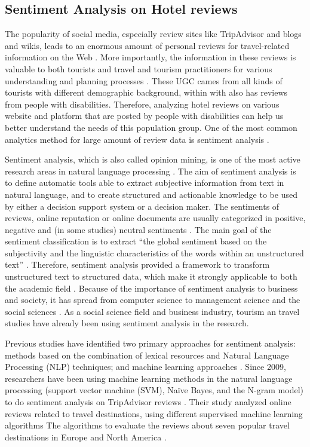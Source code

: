 \subsection{Sentiment Analysis on Hotel reviews}
The popularity of social media, especially review sites like 
TripAdvisor and blogs and wikis, leads to an enormous amount of personal 
reviews for travel-related information on the Web \cite{opinion2014}. 
More importantly, the information in these reviews is valuable to both 
tourists and travel and tourism practitioners for various understanding 
and planning processes \cite{YE20096527}. These UGC cames from all kinds of 
tourists with different demographic background, within with also has reviews 
from people with disabilities. Therefore, analyzing hotel reviews on various 
website and platform that are posted by people with disabilities can help 
us better understand the needs of this population group. One of the most 
common analytics method for large amount of review data is sentiment analysis \cite{opinion2014}.

Sentiment analysis, which is also called opinion mining, is one of the most active
research areas in natural language processing \cite{opinion2014}. The aim of 
sentiment analysis is to define automatic tools able to extract subjective 
information from text in natural \cite{article} language, and to create 
structured and actionable knowledge to be used by either a decision support 
system or a decision maker. The sentiments of reviews, online reputation or 
online documents are usually categorized in positive, negative and (in some 
studies) neutral sentiments \cite{Garcia2012}. The main goal of the sentiment 
classification is to extract ``the global sentiment based on the subjectivity 
and the linguistic characteristics of the words within an unstructured text'' 
\cite{Garcia2012}. Therefore, sentiment analysis provided a framework to 
transform unstructured text to structured data, which make it strongly 
applicable to both the academic field \cite{Cam2013}. Because of the 
importance of sentiment analysis to business and society, it has spread 
from computer science to management science and the social sciences \cite{Pozzi}. 
As a social science field and business industry, tourism an travel studies 
have already been using sentiment analysis in the research.

 Previous studies have identified two primary approaches for sentiment 
 analysis: methods based on the combination of lexical resources and 
 Natural Language Processing (NLP) techniques; and machine learning 
 approaches \cite{Garcia2012}. Since 2009, researchers have been using 
 machine learning methods in the natural language processing (support 
 vector machine (SVM), Naïve Bayes, and the N-gram model) to do sentiment 
 analysis on TripAdvisor reviews \cite{YE20096527}. 
Their study analyzed online reviews related to travel destinations, 
using different supervised machine learning algorithms The
algorithms to evaluate the reviews about seven popular travel destinations 
in Europe and North America \cite{YE20096527}.

